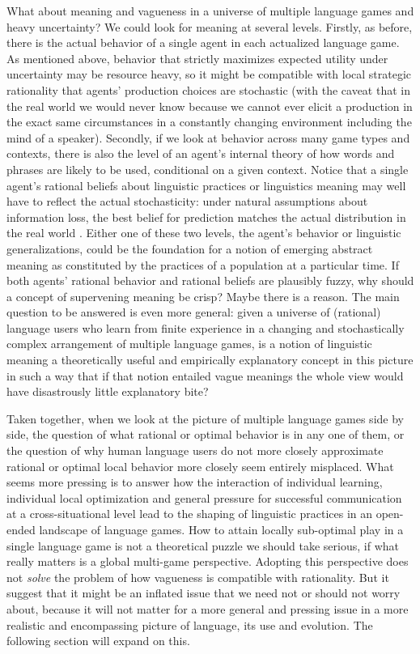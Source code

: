 \documentclass[a4paper]{article}
\begin{document}
What about meaning and vagueness in a universe of multiple language games and heavy uncertainty? 
We could look for meaning at several levels. 
Firstly, as before, there is the actual behavior of a single agent in each actualized language game. 
As mentioned above, behavior that strictly maximizes expected utility under uncertainty may be resource heavy, so it might be compatible with local strategic rationality that agents' production choices are stochastic (with the caveat that in the real world we would never know because we cannot ever elicit a production in the exact same circumstances in a constantly changing environment including the mind of a speaker).
Secondly, if we look at behavior across many game types and contexts, there is also the level of an agent's internal theory of how words and phrases are likely to be used, conditional on a given context. 
Notice that a single agent's rational beliefs about linguistic practices or linguistics meaning may well have to reflect the actual stochasticity: under natural assumptions about information loss, the best belief for prediction matches the actual distribution in the real world \parencite[\emph{e.g.}][]{VehtariOjanen2012:A-survey-of-Bay}.
Either one of these two levels, the agent's behavior or linguistic generalizations, could be the foundation for a notion of emerging abstract meaning as constituted by the practices of a population at a particular time.
If both agents' rational behavior and rational beliefs are plausibly fuzzy, why should a concept of supervening meaning be crisp? 
Maybe there is a reason.
The main question to be answered is even more general: given a universe of (rational) language users who learn from finite experience in a changing and stochastically complex arrangement of multiple language games, is a notion of linguistic meaning a theoretically useful and empirically explanatory concept in this picture in such a way that if that notion entailed vague meanings the whole view would have disastrously little explanatory bite?

Taken together, when we look at the picture of multiple language games side by side, the question of what rational or optimal behavior is in any one of them, or the question of why human language users do not more closely approximate rational or optimal local behavior more closely seem entirely misplaced.
What seems more pressing is to answer how the interaction of individual learning, individual local optimization and general pressure for successful communication at a cross-situational level lead to the shaping of linguistic practices in an open-ended landscape of language games.
How to attain locally sub-optimal play in a single language game is not a theoretical puzzle we should take serious, if what really matters is a global multi-game perspective.
Adopting this perspective does not \emph{solve} the problem of how vagueness is compatible with rationality. 
But it suggest that it might be an inflated issue that we need not or should not worry about, because it will not matter for a more general and pressing issue in a more realistic and encompassing picture of language, its use and evolution. The following section will expand on this.
\end{document}
